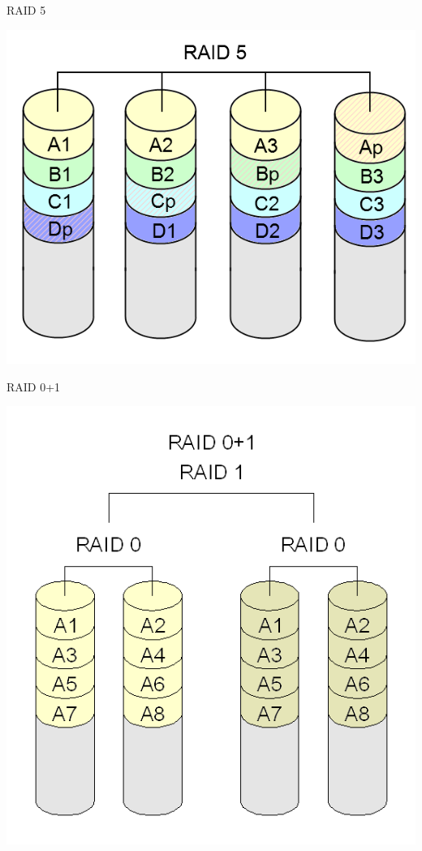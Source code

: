 \begin{frame}{RAID 5}
  
  \includegraphics[scale=.3]{raid5.png}

\end{frame}

\begin{frame}{RAID 0+1}
  
  \includegraphics[scale=.3]{raid01.png}

\end{frame}

\fi